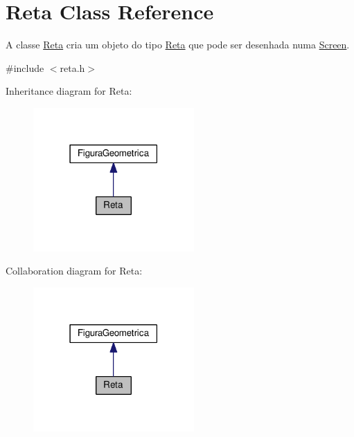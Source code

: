\hypertarget{class_reta}{}\section{Reta Class Reference}
\label{class_reta}


A classe \hyperlink{class_reta}{Reta} cria um objeto do tipo \hyperlink{class_reta}{Reta} que pode ser desenhada numa \hyperlink{class_screen}{Screen}.  




{\ttfamily \#include $<$reta.\+h$>$}



Inheritance diagram for Reta\+:
\nopagebreak
\begin{figure}[H]
\begin{center}
\leavevmode
\includegraphics[width=174pt]{class_reta__inherit__graph}
\end{center}
\end{figure}


Collaboration diagram for Reta\+:
\nopagebreak
\begin{figure}[H]
\begin{center}
\leavevmode
\includegraphics[width=174pt]{class_reta__coll__graph}
\end{center}
\end{figure}
